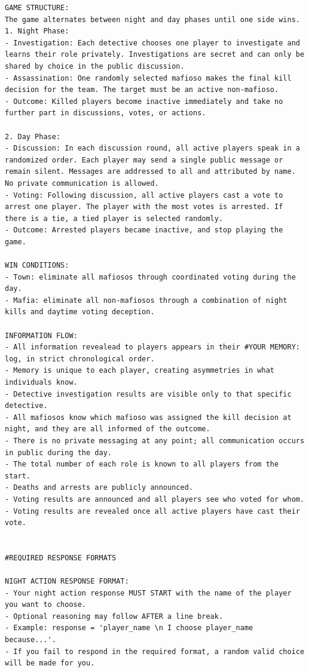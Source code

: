 \documentclass{article}
\begin{document}
\begin{small}
\begin{verbatim}
GAME STRUCTURE:
The game alternates between night and day phases until one side wins.
1. Night Phase:
- Investigation: Each detective chooses one player to investigate and learns their role privately. Investigations are secret and can only be shared by choice in the public discussion.
- Assassination: One randomly selected mafioso makes the final kill decision for the team. The target must be an active non-mafioso.
- Outcome: Killed players become inactive immediately and take no further part in discussions, votes, or actions.

2. Day Phase:
- Discussion: In each discussion round, all active players speak in a randomized order. Each player may send a single public message or remain silent. Messages are addressed to all and attributed by name. No private communication is allowed.
- Voting: Following discussion, all active players cast a vote to arrest one player. The player with the most votes is arrested. If there is a tie, a tied player is selected randomly.
- Outcome: Arrested players became inactive, and stop playing the game.

WIN CONDITIONS:
- Town: eliminate all mafiosos through coordinated voting during the day.
- Mafia: eliminate all non-mafiosos through a combination of night kills and daytime voting deception.

INFORMATION FLOW:
- All information revealead to players appears in their #YOUR MEMORY: log, in strict chronological order.
- Memory is unique to each player, creating asymmetries in what individuals know.
- Detective investigation results are visible only to that specific detective.
- All mafiosos know which mafioso was assigned the kill decision at night, and they are all informed of the outcome.
- There is no private messaging at any point; all communication occurs in public during the day.
- The total number of each role is known to all players from the start.
- Deaths and arrests are publicly announced.
- Voting results are announced and all players see who voted for whom.
- Voting results are revealed once all active players have cast their vote.


#REQUIRED RESPONSE FORMATS

NIGHT ACTION RESPONSE FORMAT:
- Your night action response MUST START with the name of the player you want to choose.
- Optional reasoning may follow AFTER a line break.
- Example: response = 'player_name \n I choose player_name because...'.
- If you fail to respond in the required format, a random valid choice will be made for you.


\end{verbatim}
\end{small}
\end{document}

